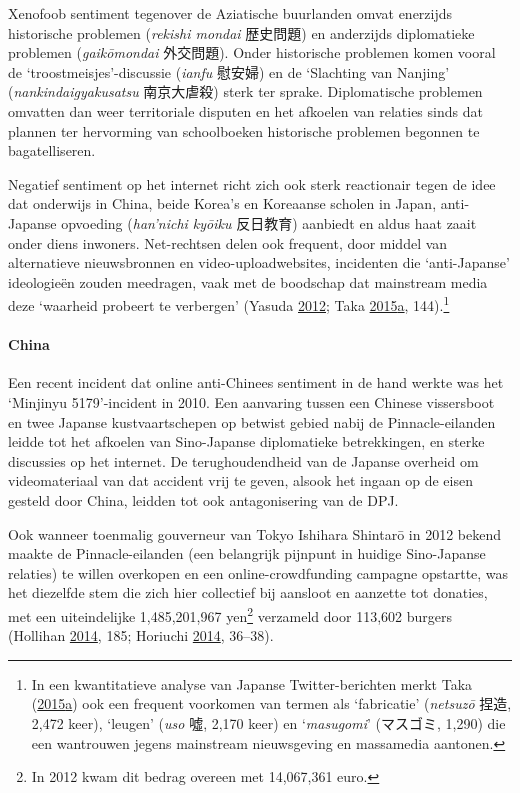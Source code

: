 \documentclass[10.5pt,dutch,]{article}
\let\oldparagraph\paragraph
\renewcommand{\paragraph}[1]{\oldparagraph{#1}\mbox{}}
\begin{document}
Xenofoob sentiment tegenover de Aziatische buurlanden omvat enerzijds
historische problemen (\emph{rekishi mondai} 歴史問題) en anderzijds
diplomatieke problemen (\emph{gaikōmondai} 外交問題). Onder historische
problemen komen vooral de `troostmeisjes'-discussie (\emph{ianfu}
慰安婦) en de `Slachting van Nanjing' (\emph{nankindaigyakusatsu}
南京大虐殺) sterk ter sprake. Diplomatische problemen omvatten dan weer
territoriale disputen en het afkoelen van relaties sinds dat plannen ter
hervorming van schoolboeken historische problemen begonnen te
bagatelliseren.

Negatief sentiment op het internet richt zich ook sterk reactionair
tegen de idee dat onderwijs in China, beide Korea's en Koreaanse scholen
in Japan, anti-Japanse opvoeding (\emph{han'nichi kyōiku} 反日教育)
aanbiedt en aldus haat zaait onder diens inwoners. Net-rechtsen delen
ook frequent, door middel van alternatieve nieuwsbronnen en
video-uploadwebsites, incidenten die `anti-Japanse' ideologieën zouden
meedragen, vaak met de boodschap dat mainstream media deze `waarheid
probeert te verbergen' (Yasuda
\protect\hyperlink{ref-yasudaux5fnettoux5f2012}{2012}; Taka
\protect\hyperlink{ref-takaux5ftwitterux5f2015-1}{2015}\protect\hyperlink{ref-takaux5ftwitterux5f2015-1}{a},
144).\footnote{In een kwantitatieve analyse van Japanse
  Twitter-berichten merkt Taka
  (\protect\hyperlink{ref-takaux5ftwitterux5f2015-1}{2015}\protect\hyperlink{ref-takaux5ftwitterux5f2015-1}{a})
  ook een frequent voorkomen van termen als `fabricatie' (\emph{netsuzō}
  捏造, 2,472 keer), `leugen' (\emph{uso} 噓, 2,170 keer) en
  `\emph{masugomi}' (マスゴミ, 1,290) die een wantrouwen jegens
  mainstream nieuwsgeving en massamedia aantonen.}

\paragraph{China}\label{china}

Een recent incident dat online anti-Chinees sentiment in de hand werkte
was het `Minjinyu 5179'-incident in 2010. Een aanvaring tussen een
Chinese vissersboot en twee Japanse kustvaartschepen op betwist gebied
nabij de Pinnacle-eilanden leidde tot het afkoelen van Sino-Japanse
diplomatieke betrekkingen, en sterke discussies op het internet. De
terughoudendheid van de Japanse overheid om videomateriaal van dat
accident vrij te geven, alsook het ingaan op de eisen gesteld door
China, leidden tot ook antagonisering van de DPJ.

Ook wanneer toenmalig gouverneur van Tokyo Ishihara Shintarō in 2012
bekend maakte de Pinnacle-eilanden (een belangrijk pijnpunt in huidige
Sino-Japanse relaties) te willen overkopen en een online-crowdfunding
campagne opstartte, was het diezelfde stem die zich hier collectief bij
aansloot en aanzette tot donaties, met een uiteindelijke 1,485,201,967
yen\footnote{In 2012 kwam dit bedrag overeen met 14,067,361 euro.}
verzameld door 113,602 burgers (Hollihan
\protect\hyperlink{ref-hollihanux5fdisputeux5f2014}{2014}, 185; Horiuchi
\protect\hyperlink{ref-horiuchiux5fpublicux5f2014}{2014}, 36--38).
\end{document}
